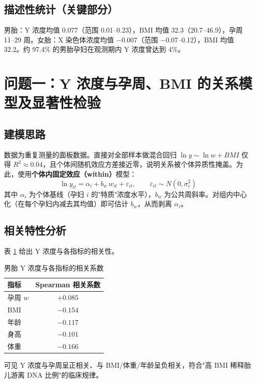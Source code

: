 \documentclass[12pt,a4paper]{article}
\begin{document}
\subsection{描述性统计（关键部分）}
男胎：Y 浓度均值 0.077（范围 0.01--0.23），BMI 均值 32.3（20.7--46.9），孕周 11--29 周。女胎：X 染色体浓度均值 $-0.007$（范围 $-0.07$--0.12），BMI 均值 32.2。约 97.4\% 的男胎孕妇在观测期内 Y 浓度曾达到 4\%。

\section{问题一：Y 浓度与孕周、BMI 的关系模型及显著性检验}
\subsection{建模思路}
数据为重复测量的面板数据。直接对全部样本做混合回归 $\ln y\sim\ln w+BMI$ 仅得 $R^2\approx0.04$，且个体间随机效应方差接近零，说明关系被个体异质性掩盖。为此，使用\textbf{个体内固定效应（within）}模型：
\begin{equation}
\ln y_{it}=\alpha_i+b_w\,w_{it}+\varepsilon_{it},\qquad \varepsilon_{it}\sim N(0,\sigma_e^2)
\end{equation}
其中 $\alpha_i$ 为个体基线（孕妇 $i$ 的"特质"浓度水平），$b_w$ 为公共周斜率。对组内中心化（在每个孕妇内减去其均值）即可估计 $b_w$，从而剥离 $\alpha_i$。

\subsection{相关特性分析}
表 \ref{tab:corr} 给出 Y 浓度与各指标的相关性。

\begin{table}[H]
\centering
\caption{男胎 Y 浓度与各指标的相关系数}
\label{tab:corr}
\begin{tabular}{lc}
\toprule
指标 & Spearman 相关系数 \\
\midrule
孕周 $w$ & $+0.085$ \\
BMI & $-0.154$ \\
年龄 & $-0.117$ \\
身高 & $-0.101$ \\
体重 & $-0.166$ \\
\bottomrule
\end{tabular}
\end{table}

可见 Y 浓度与孕周呈正相关、与 BMI/体重/年龄呈负相关，符合"高 BMI 稀释胎儿游离 DNA 比例"的临床规律。
\end{document}
